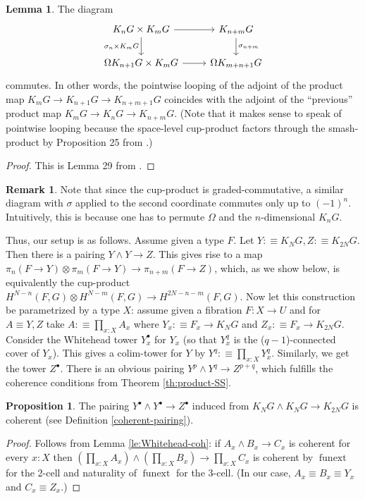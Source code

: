 \documentclass{amsart}
\theoremstyle{definition}
\newtheorem{prp}[theorem]{Proposition}
\newtheorem{re}[theorem]{Remark}
\newtheorem{lem}[theorem]{Lemma}
\newcommand{\depfun}[2]{\prod\limits_{#1}^{}{#2}}
\newcommand{\funext}{\operatorname{funext}}
\begin{document}
\begin{lem}\label{le:29}
The diagram
    \[\begin{tikzcd}
    	{K_n G \times K_m G} & {K_{n+m} G} \\
    	{\Omega K_{n+1}G \times  K_{m}G} & {\Omega K_{m+n+1}G}
    	\arrow[from=1-1, to=1-2]
    	\arrow["{\sigma_n \times K_m G}"', from=1-1, to=2-1]
    	\arrow["{\sigma_{n+m}}", from=1-2, to=2-2]
    	\arrow[from=2-1, to=2-2]
    \end{tikzcd}\]
    commutes.
    In other words, the pointwise looping of the adjoint of the product map $K_m G \to K_{n+1} G \to K_{n+m+1}G$ coincides with the adjoint of the ``previous'' product map $K_m G \to K_{n} G \to K_{n+m}G$. (Note that it makes sense to speak of pointwise looping because the space-level cup-product factors through the smash-product by  Proposition 25 from \cite{LjuMor}.)
\end{lem}
\begin{proof}
    This is Lemma 29 from \cite{LjuMor}.
\end{proof}
\begin{re}
    Note that since the cup-product is graded-commutative, a similar diagram with $\sigma$ applied to the second coordinate commutes only up to $(-1)^n$. Intuitively, this is because one has to permute $\Omega$ and the $n$-dimensional $K_n G$.
\end{re}

Thus, our setup is as follows. Assume given a type $F$.
Let $Y :\equiv K_N G, Z :\equiv K_{2N}G$. Then there is a pairing $Y \wedge Y \to Z$. This gives rise to a map $\pi_n(F \to Y) \otimes \pi_m(F \to Y) \to \pi_{n+m}(F \to Z)$, which, as we show below, is equivalently the cup-product $H^{N-n}(F, G) \otimes H^{N-m}(F, G) \to H^{2N-n-m}(F, G)$. Now let this construction be parametrized by a type $X$:
assume given a fibration $F: X \to U$ and for $A \equiv Y,Z$ take $A :\equiv \depfun{x:X}{A_x}$ where $Y_x :\equiv F_x \to K_N G$ and $Z_x :\equiv F_x \to K_{2N} G$. Consider the Whitehead tower $Y_x^\bullet$ for $Y_x$ (so that $Y_x^q$ is the ($q-1$)-connected cover of $Y_x$). This gives a colim-tower for $Y$ by $Y^q :\equiv \depfun{x:X}{Y^q_x}$. Similarly, we get the tower $Z^\bullet$. There is an obvious pairing $Y^p \wedge Y^q \to Z^{p+q}$, which fulfills the coherence conditions from Theorem \ref{th:product-SS}.
\begin{prp}
    The pairing $Y^\bullet \wedge Y^\bullet \to Z^\bullet$ induced from $K_NG \wedge K_NG \to K_{2N}G$ is coherent (see Definition \ref{coherent-pairing}).
\end{prp}
\begin{proof}
    Follows from Lemma \ref{le:Whitehead-coh}: if $A_x \wedge B_x \to C_x$ is coherent for every $x: X$ then $(\depfun{x:X}{A_x}) \wedge (\depfun{x:X}{B_x}) \to \depfun{x:X}{C_x}$ is coherent by $\funext$ for the 2-cell and naturality of $\funext$ for the 3-cell. (In our case, $A_x \equiv B_x \equiv Y_x$ and $C_x \equiv Z_x$.)
\end{proof}
\end{document}
